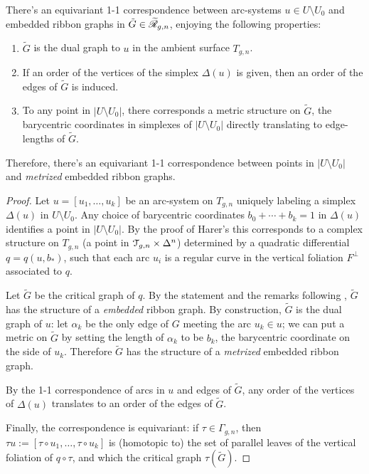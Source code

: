 \begin{lemma}
  \label{lemma:arcs-to-rg}
  There's an equivariant 1-1 correspondence between arc-systems $u \in U
  \setminus U_0$ and embedded ribbon graphs in ${\tilde G} \in \ERG[g,n]$,
  enjoying the following properties:
  \begin{enumerate}
  \item ${\tilde G}$ is the dual graph to $u$ in the ambient surface
    $T_{g,n}$.
  \item If an order of the vertices of the simplex $\Delta(u)$ is given,
    then an order of the edges of ${\tilde G}$ is induced.
  \item To any point in $|U \setminus U_0|$, there corresponds a
    metric structure on ${\tilde G}$, the barycentric coordinates
    in simplexes of $|U \setminus U_0|$ directly translating to edge-lengths
    of ${\tilde G}$.
  \end{enumerate}
  Therefore, there's an equivariant 1-1 correspondence between points
  in $|U \setminus U_0|$ and \emph{metrized} embedded ribbon graphs.
\end{lemma}
\begin{proof}
  Let $u = [u_1, \ldots, u_k]$ be an arc-system on $T_{g,n}$ uniquely
  labeling a simplex $\Delta(u)$ in $U \setminus U_0$.  Any choice of barycentric
  coordinates $b_0 + \cdots + b_k = 1$ in $\Delta(u)$ identifies a point in $|U
  \setminus U_0|$.  By the proof of Harer's  this corresponds to
  a complex structure on $T_{g,n}$ (a point in $\T_{g,n} \times \Delta^n$)
  determined by a quadratic differential $q = q(u, b_*)$, such that
  each arc $u_i$ is a regular curve in the vertical foliation $F^\perp$
  associated to $q$.

  Let ${\tilde G}$ be the critical graph of $q$.  By the statement and
  the remarks following , ${\tilde G}$ has the
  structure of a \emph{embedded} ribbon graph.  By construction,
  ${\tilde G}$ is the dual graph of $u$: let $\alpha_k$ be the only edge of
  $G$ meeting the arc $u_k \in u$; we can put a metric on ${\tilde G}$
  by setting the length of $\alpha_k$ to be $b_k$, the barycentric
  coordinate on the side of $u_k$.  Therefore ${\tilde G}$ has the
  structure of a \emph{metrized} embedded ribbon graph.

  By the 1-1 correspondence of arcs in $u$ and edges of ${\tilde G}$,
  any order of the vertices of $\Delta(u)$ translates to an order of the
  edges of ${\tilde G}$.

  Finally, the correspondence is equivariant: if $\tau \in \Gamma_{g,n}$, then
  $\tau u := [\tau \circ u_1, \ldots, \tau \circ u_k]$ is (homotopic to) the set of parallel
  leaves of the vertical foliation of $q \circ \tau$, and which the critical
  graph $\tau({\tilde G})$.
\end{proof}


